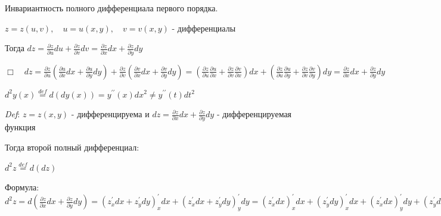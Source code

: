 \documentclass[12pt]{article}
\begin{document}
    \vspace{3mm}

    \hypertarget{invariantofdifferentialoffunctionoftwovariables}{}
    \Th Инвариантность полного дифференциала первого порядка.

    $\displaystyle z = z(u, v), \quad u = u(x, y), \quad v = v(x, y)$ - дифференциалы

    Тогда $\displaystyle dz = \frac{\partial z}{\partial u}du + \frac{\partial z}{\partial v} dv = \frac{\partial z}{\partial x} dx + \frac{\partial z}{\partial y} dy$

    $\displaystyle \Box \quad dz = \frac{\partial z}{\partial u} \left(\frac{\partial u}{\partial x} dx + \frac{\partial u}{\partial y} dy\right) +
    \frac{\partial z}{\partial v} \left(\frac{\partial v}{\partial x} dx + \frac{\partial v}{\partial y} dy\right) =
    \left(\frac{\partial z}{\partial u} \frac{\partial u}{\partial x} + \frac{\partial z}{\partial v} \frac{\partial v}{\partial x}\right) dx +
    \left(\frac{\partial z}{\partial u} \frac{\partial u}{\partial y} + \frac{\partial z}{\partial v} \frac{\partial v}{\partial y}\right) dy =
    \frac{\partial z}{\partial x} dx + \frac{\partial z}{\partial y} dy$


    \Mem $\displaystyle d^2 y(x) \stackrel{def}{=} d(dy(x)) = y^{\prime\prime}(x) dx^2 \neq y^{\prime\prime}(t) dt^2$

    \vspace{3mm}
    
    \textit{Def}: $\displaystyle z = z(x, y)$ - дифференцируема и $\displaystyle dz = \frac{\partial z}{\partial x}dx + \frac{\partial z}{\partial y}dy$ - дифференцируемая функция

    \hypertarget{seconddifferentialoffunctionoftwovariables}{}

    Тогда второй полный дифференциал:

    $\displaystyle d^2 z \stackrel{def}{=} d(dz)$

    Формула: $\displaystyle d^2 z = d\left(\frac{\partial z}{\partial x}dx + \frac{\partial z}{\partial y}dy\right) = (z^\prime_x dx + z^\prime_y dy)^\prime_x dx + (z^\prime_x dx + z^\prime_y dy)^\prime_y dy =
    (z^\prime_x dx)^\prime_x dx + (z^\prime_y dy)^\prime_x dx + (z^\prime_x dx)^\prime_y dy + (z^\prime_y dy)^\prime_y dy =
    (z^\prime_x)^\prime_x (dx)^2 + (z^\prime_y)^\prime_x dxdy + (z^\prime_x)^\prime_y dydx + (z^\prime_y)^\prime_y (dy)^2 =
    \frac{\partial^2 z}{\partial x^2} (dx)^2 + 2 \frac{\partial^2 z}{\partial x \partial y} dxdy + \frac{\partial^2 z}{\partial y^2} (dy)^2$
\end{document}
